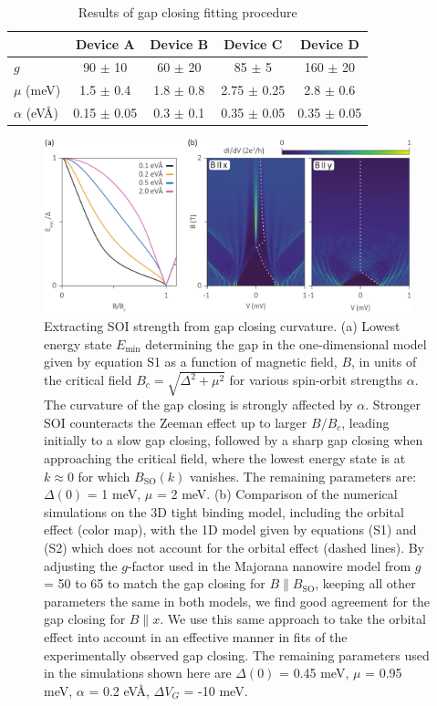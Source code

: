 \begin{table}[h]
\label{tab:AlphaFit}
\caption{Results of gap closing fitting procedure}
\begin{tabular}{l|cccc}
& Device A & Device B & Device C & Device D \\
\hline 
$g$ & 90 $\pm$ 10 & 60 $\pm$ 20 & 85 $\pm$ 5 & 160 $\pm$ 20\\
$\mu$ (meV) & 1.5 $\pm$ 0.4 & 1.8 $\pm$ 0.8 & 2.75 $\pm$ 0.25 & 2.8 $\pm$ 0.6\\
$\alpha$ (eV\AA) & 0.15 $\pm$ 0.05 & 0.3 $\pm$ 0.1 & 0.35 $\pm$ 0.05 & 0.35 $\pm$ 0.05\\
\end{tabular}
\end{table}

\begin{figure}
\centering
\includegraphics[width=0.95\textwidth]{figures/SFig7_AlphaFitting.pdf}
\caption{\label{fig:SOIFit}
Extracting SOI strength from gap closing curvature.
(a) Lowest energy state $E_{\mathrm{min}}$ determining the gap in the one-dimensional model given by equation S1 as a function of magnetic field, $B$, in units of the critical field $B_c=\sqrt{\Delta^2+\mu^2}$ for various spin-orbit strengths $\alpha$.
The curvature of the gap closing is strongly affected by $\alpha$.
Stronger SOI counteracts the Zeeman effect up to larger $B/B_c$, leading initially to a slow gap closing, followed by a sharp gap closing when approaching the critical field, where the lowest energy state is at $k \approx 0$ for which $B_{\mathrm{SO}}(k)$ vanishes.
The remaining parameters are: $\Delta(0)$ = 1 meV, $\mu$ = 2 meV.
(b) Comparison of the numerical simulations on the 3D tight binding model, including the orbital effect (color map), with the 1D model given by equations (S1) and (S2) which does not account for the orbital effect (dashed lines).
By adjusting the $g$-factor used in the Majorana nanowire model from $g$ = 50 to 65 to match the gap closing for $B \parallel B_{\mathrm{SO}}$, keeping all other parameters the same in both models, we find good agreement for the gap closing for $B \parallel x$.
We use this same approach to take the orbital effect into account in an effective manner in fits of the experimentally observed gap closing.
The remaining parameters used in the simulations shown here are $\Delta(0)$ = 0.45 meV, $\mu$ = 0.95 meV, $\alpha$ = 0.2 eV\AA, $\Delta V_G$ = -10 meV.
}
\end{figure}

